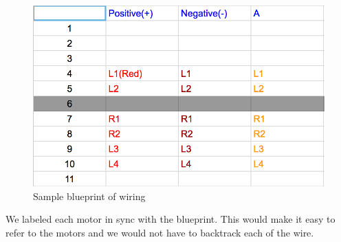 \documentclass[index=totoc,hyperref,openany]{labbook} %
\begin{document}
\begin{figure}[H]
\begin{center}
\includegraphics[width=0.4\linewidth]{wiring_blueprint}
\end{center}
\caption{Sample blueprint of wiring}
\label{fig:wiring_blueprint}
\end{figure}

We labeled each motor in sync with the blueprint. This would make it easy to refer to the motors and we would not have to backtrack each of the wire.
\end{document}

